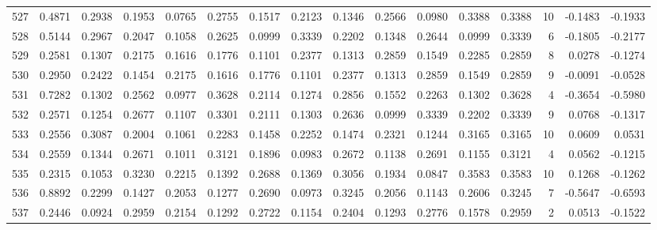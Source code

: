 \begin{tabular}{lrrrrrrrrrrrrrrr}
527 &      0.4871 &  0.2938 &  0.1953 &  0.0765 &  0.2755 &  0.1517 &  0.2123 &  0.1346 &  0.2566 &  0.0980 &   0.3388 &     0.3388 &     10 &                   -0.1483 &                    -0.1933 \\
528 &      0.5144 &  0.2967 &  0.2047 &  0.1058 &  0.2625 &  0.0999 &  0.3339 &  0.2202 &  0.1348 &  0.2644 &   0.0999 &     0.3339 &      6 &                   -0.1805 &                    -0.2177 \\
529 &      0.2581 &  0.1307 &  0.2175 &  0.1616 &  0.1776 &  0.1101 &  0.2377 &  0.1313 &  0.2859 &  0.1549 &   0.2285 &     0.2859 &      8 &                    0.0278 &                    -0.1274 \\
530 &      0.2950 &  0.2422 &  0.1454 &  0.2175 &  0.1616 &  0.1776 &  0.1101 &  0.2377 &  0.1313 &  0.2859 &   0.1549 &     0.2859 &      9 &                   -0.0091 &                    -0.0528 \\
531 &      0.7282 &  0.1302 &  0.2562 &  0.0977 &  0.3628 &  0.2114 &  0.1274 &  0.2856 &  0.1552 &  0.2263 &   0.1302 &     0.3628 &      4 &                   -0.3654 &                    -0.5980 \\
532 &      0.2571 &  0.1254 &  0.2677 &  0.1107 &  0.3301 &  0.2111 &  0.1303 &  0.2636 &  0.0999 &  0.3339 &   0.2202 &     0.3339 &      9 &                    0.0768 &                    -0.1317 \\
533 &      0.2556 &  0.3087 &  0.2004 &  0.1061 &  0.2283 &  0.1458 &  0.2252 &  0.1474 &  0.2321 &  0.1244 &   0.3165 &     0.3165 &     10 &                    0.0609 &                     0.0531 \\
534 &      0.2559 &  0.1344 &  0.2671 &  0.1011 &  0.3121 &  0.1896 &  0.0983 &  0.2672 &  0.1138 &  0.2691 &   0.1155 &     0.3121 &      4 &                    0.0562 &                    -0.1215 \\
535 &      0.2315 &  0.1053 &  0.3230 &  0.2215 &  0.1392 &  0.2688 &  0.1369 &  0.3056 &  0.1934 &  0.0847 &   0.3583 &     0.3583 &     10 &                    0.1268 &                    -0.1262 \\
536 &      0.8892 &  0.2299 &  0.1427 &  0.2053 &  0.1277 &  0.2690 &  0.0973 &  0.3245 &  0.2056 &  0.1143 &   0.2606 &     0.3245 &      7 &                   -0.5647 &                    -0.6593 \\
537 &      0.2446 &  0.0924 &  0.2959 &  0.2154 &  0.1292 &  0.2722 &  0.1154 &  0.2404 &  0.1293 &  0.2776 &   0.1578 &     0.2959 &      2 &                    0.0513 &                    -0.1522 \\

\end{tabular}
